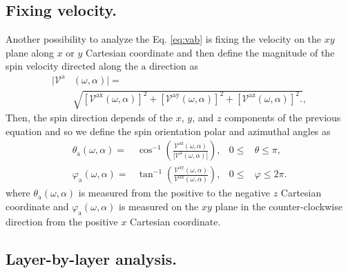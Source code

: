 \documentclass[prb,11pt,tightenlines,twocolumn,aps]{revtex4-1}
\begin{document}


\subsection{Fixing velocity.}\label{sec:theory-fixvel}

{\color{red} Another possibility to analyze the Eq. \eqref{eq:vab} is fixing
the velocity on the $xy$ plane along $x$ or $y$ Cartesian coordinate and then
define the magnitude of the spin velocity directed along the $\mathrm{a}$
direction as}
\begin{align}
|\mathcal{V}^{\mathrm{a}}&(\omega,\alpha)| = \nonumber \\
&\sqrt { 
[\mathcal{V}^{\mathrm{ax}}(\omega,\alpha)]^{2} +
[\mathcal{V}^{\mathrm{ay}}(\omega,\alpha)]^{2} +
[\mathcal{V}^{\mathrm{az}}(\omega,\alpha)]^{2} .
},
\label{eq:vv-mag}
\end{align}
{\color{red} Then, the spin direction depends of the $x$, $y$, and $z$
components of the previous equation and so we define the spin orientation polar
and azimuthal angles as}
\begin{align}
\theta_{\mathrm{a}}  (\omega,\alpha)
=& 
\cos^{-1} \left( \frac{\mathcal{V}^{\mathrm{az}}(\omega,\alpha)}
{|\mathcal{V}^{\mathrm{a}}(\omega,\alpha)|} \right),
& 0 \leq &\theta \leq \pi, 
\label{eq:polar-ang}
\\
\varphi_{\mathrm{a}} (\omega,\alpha)
=& 
\tan^{-1} \left( \frac{\mathcal{V}^{\mathrm{ay}}(\omega,\alpha)}
{\mathcal{V}^{\mathrm{ax}}(\omega,\alpha)} \right),
& 0 \leq &\varphi \leq 2\pi.
\label{eq:azimuthal-ang} 
\end{align}
{\color{red} where $\theta_{\mathrm{a}}(\omega,\alpha)$ is measured from the
positive to the negative $z$ Cartesian coordinate and
$\varphi_{\mathrm{a}}(\omega,\alpha)$ is measured on the $xy$ plane in the
counter-clockwise direction from the positive $x$ Cartesian coordinate.}




\subsection{Layer-by-layer analysis.}\label{sec:theory-layer}
\end{document}
